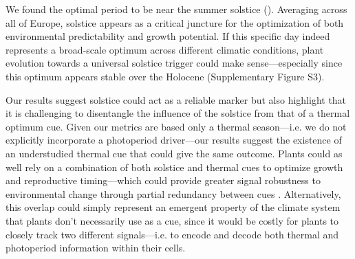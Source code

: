 \documentclass[11pt,letter]{article}
\begin{document}
We found the optimal period to be near the summer solstice (). Averaging across all of Europe, solstice appears as a critical juncture for the optimization of both environmental predictability and growth potential.
If this specific day indeed represents a broad-scale optimum across different climatic conditions, plant evolution towards a universal solstice trigger could make sense---especially since this optimum appears stable over the Holocene (Supplementary Figure S3). %

Our results suggest solstice could act as a reliable marker but also highlight that it is challenging to disentangle the influence of the solstice from that of a thermal optimum cue. %
Given our metrics are based only a thermal season---i.e. we do not explicitly incorporate a photoperiod driver---our results suggest the existence of an understudied thermal cue that could give the same outcome.
Plants could as well rely on a combination of both solstice and thermal cues to optimize growth and reproductive timing---which could provide greater signal robustness to environmental change through partial redundancy between cues \citep{Bonamour2019}.
Alternatively, this overlap could simply represent an emergent property of the climate system that plants don't necessarily use as a cue, since it would be costly for plants to closely track two different signals---i.e. to encode and decode both thermal and photoperiod information within their cells. 
\end{document}

